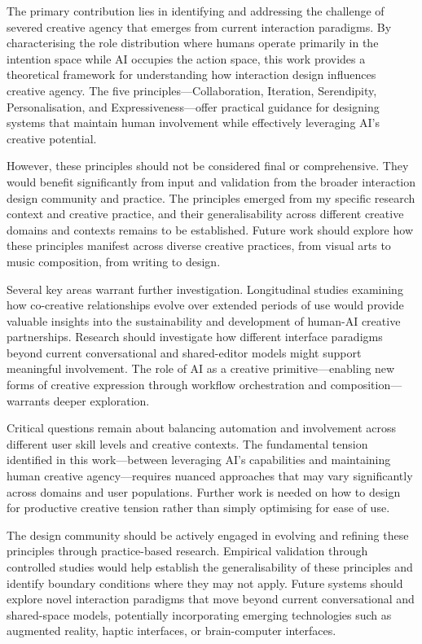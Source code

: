The primary contribution lies in identifying and addressing the challenge of severed creative agency that emerges from current interaction paradigms. By characterising the role distribution where humans operate primarily in the intention space while AI occupies the action space, this work provides a theoretical framework for understanding how interaction design influences creative agency. The five principles—Collaboration, Iteration, Serendipity, Personalisation, and Expressiveness—offer practical guidance for designing systems that maintain human involvement while effectively leveraging AI's creative potential.

However, these principles should not be considered final or comprehensive. They would benefit significantly from input and validation from the broader interaction design community and practice. The principles emerged from my specific research context and creative practice, and their generalisability across different creative domains and contexts remains to be established. Future work should explore how these principles manifest across diverse creative practices, from visual arts to music composition, from writing to design.

Several key areas warrant further investigation. Longitudinal studies examining how co-creative relationships evolve over extended periods of use would provide valuable insights into the sustainability and development of human-AI creative partnerships. Research should investigate how different interface paradigms beyond current conversational and shared-editor models might support meaningful involvement. The role of AI as a creative primitive—enabling new forms of creative expression through workflow orchestration and composition—warrants deeper exploration.

Critical questions remain about balancing automation and involvement across different user skill levels and creative contexts. The fundamental tension identified in this work—between leveraging AI's capabilities and maintaining human creative agency—requires nuanced approaches that may vary significantly across domains and user populations. Further work is needed on how to design for productive creative tension rather than simply optimising for ease of use.

The design community should be actively engaged in evolving and refining these principles through practice-based research. Empirical validation through controlled studies would help establish the generalisability of these principles and identify boundary conditions where they may not apply. Future systems should explore novel interaction paradigms that move beyond current conversational and shared-space models, potentially incorporating emerging technologies such as augmented reality, haptic interfaces, or brain-computer interfaces.

